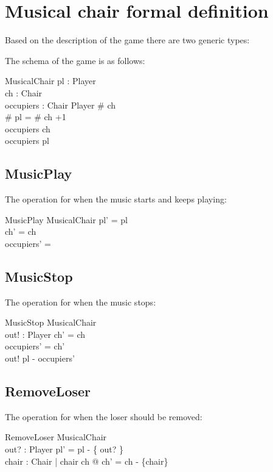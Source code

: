 \documentclass{article}
\begin{document}
\section{Musical chair formal definition}
Based on the description of the game there are two generic types:
\begin{zed}
\end{zed}

The schema of the game is as follows:

\begin{schema}{MusicalChair}
  pl : \finset Player\\
  ch : \finset Chair \\
  occupiers : Chair  \pinj Player
\where
  \# ch \\
  \# pl = \# ch +1\\
  \dom occupiers \subseteq ch\\
  \ran occupiers \subseteq pl
\end{schema}

\subsection*{MusicPlay}
The operation for when the music starts and keeps playing:
\begin{schema}{MusicPlay}
  \Delta MusicalChair
\where
  pl' = pl\\
  ch' = ch\\
  occupiers' = \emptyset
\end{schema}

\subsection*{MusicStop}
The operation for when the music stops:
\begin{schema}{MusicStop}
  \Delta MusicalChair\\
  out! : Player
\where
  ch' = ch\\
  \dom occupiers' = ch'\\
  out! \in pl - \ran occupiers'
\end{schema}

\subsection*{RemoveLoser}
The operation for when the loser should be removed:
\begin{schema}{RemoveLoser}
  \Delta MusicalChair\\
  out? : Player
\where
  pl' = pl - \{ out? \}\\
  \exists chair : Chair | chair \in ch @ ch' = ch - \{chair\}
\end{schema}
\end{document}
